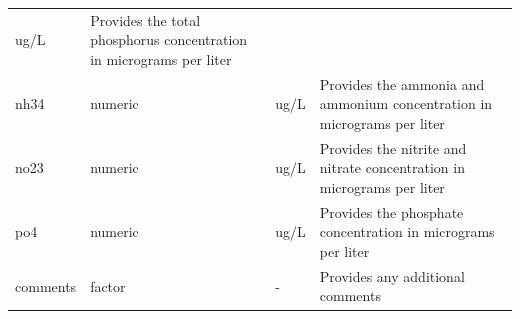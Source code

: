 \documentclass[12pt,]{article}
\begin{document}
\begin{longtable}[]{@{}llll@{}}
\begin{minipage}[t]{0.12\columnwidth}
ug/L\strut
\end{minipage} & \begin{minipage}[t]{0.38\columnwidth}\raggedright
Provides the total phosphorus concentration in micrograms per
liter\strut
\end{minipage}\tabularnewline
\begin{minipage}[t]{0.25\columnwidth}\raggedright
nh34\strut
\end{minipage} & \begin{minipage}[t]{0.13\columnwidth}\raggedright
numeric\strut
\end{minipage} & \begin{minipage}[t]{0.12\columnwidth}\raggedright
ug/L\strut
\end{minipage} & \begin{minipage}[t]{0.38\columnwidth}\raggedright
Provides the ammonia and ammonium concentration in micrograms per
liter\strut
\end{minipage}\tabularnewline
\begin{minipage}[t]{0.25\columnwidth}\raggedright
no23\strut
\end{minipage} & \begin{minipage}[t]{0.13\columnwidth}\raggedright
numeric\strut
\end{minipage} & \begin{minipage}[t]{0.12\columnwidth}\raggedright
ug/L\strut
\end{minipage} & \begin{minipage}[t]{0.38\columnwidth}\raggedright
Provides the nitrite and nitrate concentration in micrograms per
liter\strut
\end{minipage}\tabularnewline
\begin{minipage}[t]{0.25\columnwidth}\raggedright
po4\strut
\end{minipage} & \begin{minipage}[t]{0.13\columnwidth}\raggedright
numeric\strut
\end{minipage} & \begin{minipage}[t]{0.12\columnwidth}\raggedright
ug/L\strut
\end{minipage} & \begin{minipage}[t]{0.38\columnwidth}\raggedright
Provides the phosphate concentration in micrograms per liter\strut
\end{minipage}\tabularnewline
\begin{minipage}[t]{0.25\columnwidth}\raggedright
comments\strut
\end{minipage} & \begin{minipage}[t]{0.13\columnwidth}\raggedright
factor\strut
\end{minipage} & \begin{minipage}[t]{0.12\columnwidth}\raggedright
-\strut
\end{minipage} & \begin{minipage}[t]{0.38\columnwidth}\raggedright
Provides any additional comments\strut
\end{minipage}\tabularnewline
\bottomrule
\end{longtable}
\end{document}
